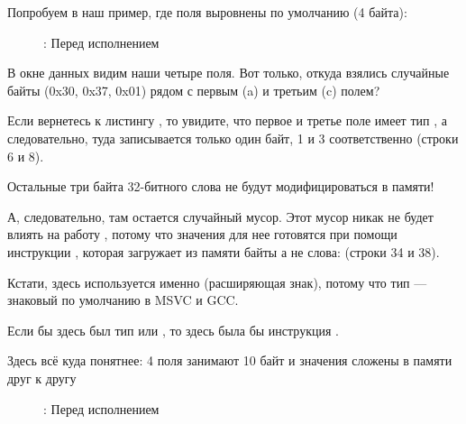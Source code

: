 ﻿\clearpage
{}
\myindex{\olly}

Попробуем в \olly наш пример, где поля выровнены по умолчанию (4 байта):

\begin{figure}[H]
\centering
{}
\caption{\olly: Перед исполнением \printf}
\label{fig:packing_olly_4}
\end{figure}

В окне данных видим наши четыре поля.
Вот только, откуда взялись случайные байты (0x30, 0x37, 0x01) рядом с первым (a) и третьим (c) полем?

Если вернетесь к листингу , то увидите, что первое и третье поле имеет
тип \Tchar, а следовательно, туда записывается только один байт, 1 и 3 соответственно (строки 6 и 8).

Остальные три байта 32-битного слова не будут модифицироваться в памяти!

А, следовательно, там остается случайный мусор.
Этот мусор никак не будет влиять на работу \printf,
потому что значения для нее готовятся при помощи инструкции \MOVSX, которая загружает
из памяти байты а не слова: 
 (строки 34 и 38).

Кстати, здесь используется именно \MOVSX (расширяющая знак), потому что тип 
\Tchar --- знаковый по умолчанию в MSVC и GCC.

Если бы здесь был тип  или , 
то здесь была бы инструкция \MOVZX.

\clearpage
{}
\myindex{\olly}

Здесь всё куда понятнее: 4 поля занимают 10 байт и значения сложены в памяти друг к другу

\begin{figure}[H]
\centering
{}
\caption{\olly: Перед исполнением \printf}
\label{fig:packing_olly_1}
\end{figure}
